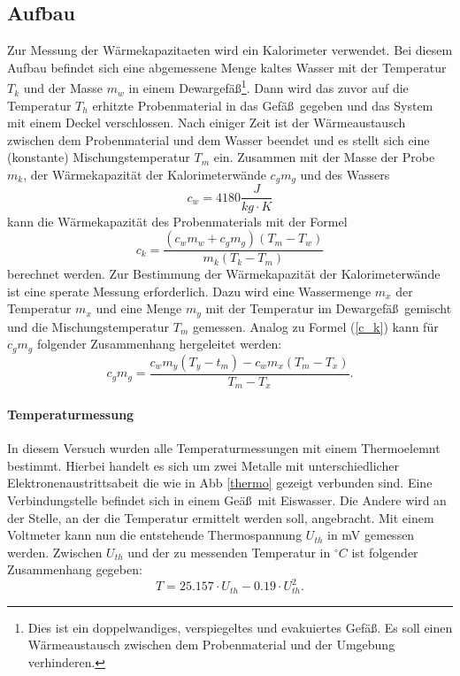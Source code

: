 \documentclass[11pt,ngerman,a4paper]{article}
\begin{document}
\subsection{Aufbau}
Zur Messung der W\"armekapazitaeten wird ein  Kalorimeter verwendet.
Bei diesem Aufbau befindet sich eine abgemessene Menge kaltes Wasser mit der Temperatur $T_k$ und der Masse $m_w$ in einem Dewargef\"a\ss\footnote{Dies ist ein doppelwandiges, verspiegeltes und evakuiertes Gef\"a\ss. Es soll einen W\"armeaustausch zwischen dem Probenmaterial und der Umgebung verhinderen.}. Dann wird das zuvor auf die Temperatur $T_h$ erhitzte Probenmaterial in das Gef\"a\ss\ gegeben und das System mit einem Deckel verschlossen. Nach einiger Zeit ist der W\"armeaustausch zwischen dem Probenmaterial und dem Wasser beendet und es stellt sich eine (konstante) Mischungstemperatur $T_m$ ein. Zusammen mit der Masse der Probe $m_k$, der W\"armekapazit\"at der Kalorimeterw\"ande $c_gm_g$ und des Wassers 
\[c_w = 4180 \frac{J}{kg\cdot K}\]
kann die W\"armekapazit\"at des Probenmaterials mit der Formel 
\begin{equation}
\label{c_k}
c_k = \frac{(c_wm_w+c_gm_g)(T_m-T_w)}{m_k(T_k-T_m)}
\end{equation}
berechnet werden. Zur Bestimmung der W\"armekapazit\"at der Kalorimeterw\"ande ist eine sperate Messung erforderlich. Dazu wird eine Wassermenge $m_x$ der Temperatur $m_x$ und eine Menge $m_y$ mit der Temperatur im Dewargef\"a\ss\ gemischt und die Mischungstemperatur $T_m$ gemessen. Analog zu Formel (\ref{c_k}) kann f\"ur $c_gm_g$ folgender Zusammenhang hergeleitet werden:
\begin{equation}
c_gm_g= \frac{c_wm_y(T_y-t_m)-c_wm_x(T_m-T_x)}{T_m-T_x}.
\end{equation}
\paragraph{Temperaturmessung} In diesem Versuch wurden alle Temperaturmessungen mit einem Thermoelemnt bestimmt. Hierbei handelt es sich um zwei Metalle mit unterschiedlicher Elektronenaustrittsabeit die wie in Abb \ref{thermo} gezeigt verbunden sind. Eine Verbindungstelle befindet sich in einem Ge\"a\ss\ mit Eiswasser. Die Andere wird an der Stelle, an der die Temperatur ermittelt werden soll, angebracht. Mit einem Voltmeter kann nun die entstehende Thermospannung $U_{th}$ in mV gemessen werden. Zwischen $U_{th}$ und der zu messenden Temperatur in $^\circ C$ ist folgender Zusammenhang gegeben:
\begin{equation}
T = 25.157\cdot U_{th} - 0.19\cdot U_{th}^2.
\end{equation} 
\end{document}
